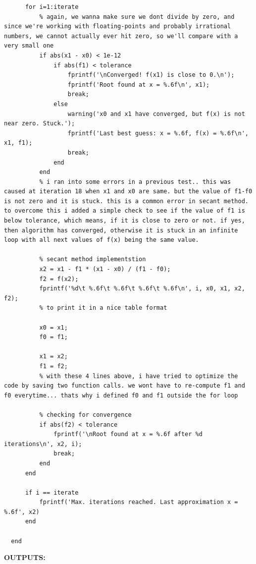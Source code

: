 \documentclass[12pt]{report}
\begin{document}
\begin{lstlisting}
      for i=1:iterate
          % again, we wanna make sure we dont divide by zero, and since we're working with floating-points and probably irrational numbers, we cannot actually ever hit zero, so we'll compare with a very small one
          if abs(x1 - x0) < 1e-12
              if abs(f1) < tolerance
                  fprintf('\nConverged! f(x1) is close to 0.\n');
                  fprintf('Root found at x = %.6f\n', x1);
                  break;
              else
                  warning('x0 and x1 have converged, but f(x) is not near zero. Stuck.');
                  fprintf('Last best guess: x = %.6f, f(x) = %.6f\n', x1, f1);
                  break;
              end
          end
          % i ran into some errors in a previous test.. this was caused at iteration 18 when x1 and x0 are same. but the value of f1-f0 is not zero and it is stuck. this is a common error in secant method. to overcome this i added a simple check to see if the value of f1 is below tolerance, which means, if it is close to zero or not. if yes, then algorithm has converged, otherwise it is stuck in an infinite loop with all next values of f(x) being the same value.
      
          % secant method implementstion
          x2 = x1 - f1 * (x1 - x0) / (f1 - f0);
          f2 = f(x2);
          fprintf('%d\t %.6f\t %.6f\t %.6f\t %.6f\n', i, x0, x1, x2, f2);
          % to print it in a nice table format
      
          x0 = x1;
          f0 = f1;
      
          x1 = x2;
          f1 = f2;
          % with these 4 lines above, i have tried to optimize the code by saving two function calls. we wont have to re-compute f1 and f0 everytime... thats why i defined f0 and f1 outside the for loop
      
          % checking for convergence
          if abs(f2) < tolerance
              fprintf('\nRoot found at x = %.6f after %d iterations\n', x2, i);
              break;
          end
      end
      
      if i == iterate
          fprintf('Max. iterations reached. Last approximation x = %.6f', x2)
      end

  end
  \end{lstlisting}
  \vspace{0.5cm}
  \textbf{OUTPUTS:} \\
\end{document}
